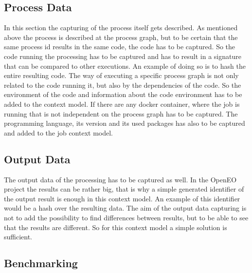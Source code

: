 \documentclass[draft,final]{vutinfth} %
\begin{document}
\subsection{Process Data}
In this section the capturing of the process itself gets described. As mentioned above the process is described at the process graph, but to be certain that the same process id results in the same code, the code has to be captured. So the code running the processing has to be captured and has to result in a signature that can be compared to other executions. An example of doing so is to hash the entire resulting code. 
The way of executing a specific process graph is not only related to the code running it, but also by the dependencies of the code. So the environment of the code and information about the code environment has to be added to the context model. If there are any docker container, where the job is running that is not independent on the process graph has to be captured. The programming language, its version and its used packages has also to be captured and added to the job context model.

\subsection{Output Data}
The output data of the processing has to be captured as well. In the OpenEO project the results can be rather big, that is why a simple generated identifier of the output result is enough in this context model. An example of this identifier would be a hash over the resulting data. The aim of the output data capturing is not to add the possibility to find differences between results, but to be able to see that the results are different. So for this context model a simple solution is sufficient. 

\subsection{Benchmarking}
\end{document}
